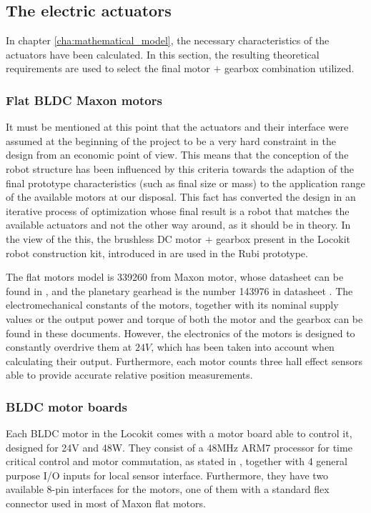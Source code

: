 
\subsection{The electric actuators} %
\label{sub:electric_actuators}
In chapter \ref{cha:mathematical_model}, the necessary characteristics of the actuators have been calculated.
In this section, the resulting theoretical requirements are used to select the final motor $+$ gearbox combination utilized.

\subsubsection{Flat BLDC Maxon motors} %
\label{ssub:the_bldc_motors}
It must be mentioned at this point that the actuators and their interface were assumed at the beginning of the project to be a very hard constraint in the design from an economic point of view. 
This means that the conception of the robot structure has been influenced by this criteria towards the adaption of the final prototype characteristics (such as final size or mass) to the application range of the available motors at our disposal.
This fact has converted the design in an iterative process of optimization whose final result is a robot that matches the available actuators and not the other way around, as it should be in theory.
In the view of the this, the brushless DC motor $+$ gearbox present in the Locokit robot construction kit, introduced in \cite{locokit} are used in the Rubi prototype.

The flat motors model is 339260 from Maxon motor, whose datasheet can be found in \cite{maxon_motor}, and the planetary gearhead is the number 143976 in datasheet \cite{maxon_gear}.
The electromechanical constants of the motors, together with its nominal supply values or the output power and torque of both the motor and the gearbox can be found in these documents. 
However, the electronics of the motors is designed to constantly overdrive them at $24V$, which has been taken into account when calculating their output.
Furthermore, each motor counts three hall effect sensors able to provide accurate relative position measurements.



\subsubsection{BLDC motor boards} %
\label{ssub:bldc_motor_boards}
Each BLDC motor in the Locokit comes with a motor board able to control it, designed for 24V and 48W.
They consist of a 48MHz ARM7 processor for time critical control and motor commutation, as stated in \cite{locokit-electronics}, together with 4 general purpose I/O inputs for local sensor interface.
Furthermore, they have two available 8-pin interfaces for the motors, one of them with a standard flex connector used in most of Maxon flat motors.

